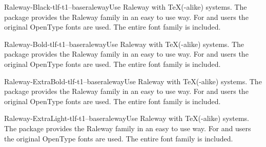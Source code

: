 \documentclass{ddltxtyp}
\begin{document}
\begin{package}{Raleway-Black-tlf-t1--base}{raleway}{Use Raleway with {\TeX}(-alike) systems.}
The package provides the Raleway family in an easy to use way.
For {\XeLaTeX} and {\LuaLaTeX} users the original OpenType fonts are
used. The entire font family is included.
\end{package}
\begin{package}{Raleway-Bold-tlf-t1--base}{raleway}{Use Raleway with {\TeX}(-alike) systems.}
The package provides the Raleway family in an easy to use way.
For {\XeLaTeX} and {\LuaLaTeX} users the original OpenType fonts are
used. The entire font family is included.
\end{package}
\begin{package}{Raleway-ExtraBold-tlf-t1--base}{raleway}{Use Raleway with {\TeX}(-alike) systems.}
The package provides the Raleway family in an easy to use way.
For {\XeLaTeX} and {\LuaLaTeX} users the original OpenType fonts are
used. The entire font family is included.
\end{package}
\begin{package}{Raleway-ExtraLight-tlf-t1--base}{raleway}{Use Raleway with {\TeX}(-alike) systems.}
The package provides the Raleway family in an easy to use way.
For {\XeLaTeX} and {\LuaLaTeX} users the original OpenType fonts are
used. The entire font family is included.
\end{package}
\end{document}
